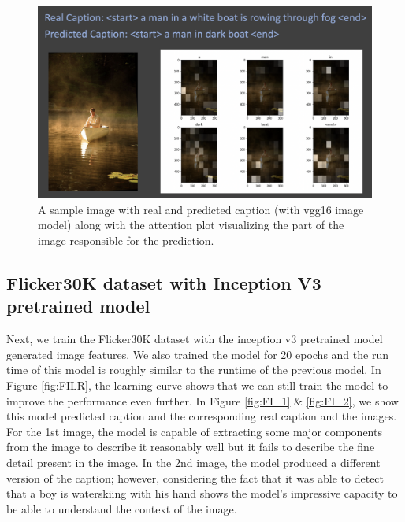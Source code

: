 \documentclass[12pt]{article}
\begin{document}
\begin{figure}[h!]
\begin{center}
\includegraphics[width=7in]{FV_1.png}
\end{center}
\caption{\label{fig:FV_1}
A sample image with real and predicted caption (with vgg16 image model) along with the attention plot visualizing the part of the image responsible for the prediction.}
\end{figure}

\subsection{Flicker30K dataset with Inception V3 pretrained model}
\label{sec:imfeat}

Next, we train the Flicker30K dataset with the inception v3 pretrained model generated image features. We also trained the model for 20 epochs and the run time of this model is roughly similar to the runtime of the previous model. In Figure \ref{fig:FILR}, the learning curve shows that we can still train the model to improve the performance even further. In Figure \ref{fig:FI_1} \& \ref{fig:FI_2}, we show this model predicted caption and the corresponding real caption and the images. For the 1st image, the model is capable of extracting some major components from the image to describe it reasonably well but it fails to describe the fine detail present in the image. In the 2nd image, the model produced a different version of the caption; however, considering the fact that it was able to detect that a boy is waterskiing with his hand shows the model's impressive capacity to be able to understand the context of the image.
\end{document}
